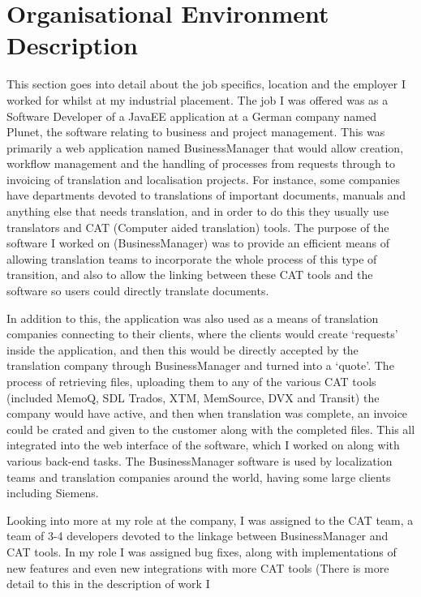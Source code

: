 \documentclass[12pt]{article}
\begin{document}
\section{Organisational Environment Description}
This section goes into detail about the job specifics, location and the employer I worked for whilst at my industrial
placement. The job I was offered was as a Software Developer of a JavaEE application at a German company named Plunet,
the software relating to business and project management. This was primarily a web application named BusinessManager
that would allow creation, workflow management and the handling of processes from requests through to invoicing of
translation and localisation projects. For instance, some companies have departments devoted to translations of
important documents, manuals and anything else that needs translation, and in order to do this they usually use
translators and CAT (Computer aided translation) tools. The purpose of the software I worked on (BusinessManager) was to
provide an efficient means of allowing translation teams to incorporate the whole process of this type of transition,
and also to allow the linking between these CAT tools and the software so users could directly translate documents.\\ \par \noindent
In addition to this, the application was also used as a means of translation companies connecting to their clients,
where the clients would create ‘requests’ inside the application, and then this would be directly accepted by the
translation company through BusinessManager and turned into a ‘quote’. The process of retrieving files, uploading them
to any of the various CAT tools (included MemoQ, SDL Trados, XTM, MemSource, DVX and Transit)  
the company would have active, and then when translation was complete, an invoice could
be crated and given to the customer along with the completed files. This all integrated into the web interface of the
software, which I worked on along with various back-end tasks. The BusinessManager software is used by localization
teams and translation companies around the world, having some large clients including Siemens.\\ \par \noindent
Looking into more at my role at the company, I was assigned to the CAT team, a team of 3-4 developers devoted to the
linkage between BusinessManager and CAT tools. In my role I was assigned bug fixes, along with implementations of new
features and even new integrations with more CAT tools (There is more detail to this in the description of work I
\end{document}
